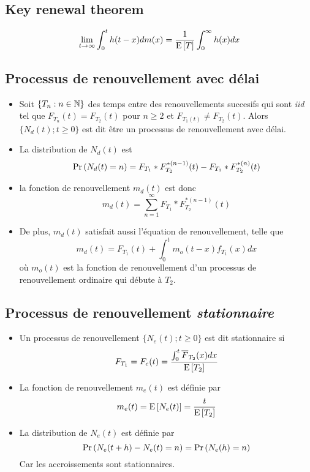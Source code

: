 \documentclass[10pt, french]{article}
\begin{document}
\begin{multicols*}{2}
\subsection*{Key renewal theorem}
\[\lim_{t \to \infty} \int_{0}^{t} h(t-x) d m(x) = \frac{1}{\mathrm{E} \left[ T \right]} \int_{0}^{\infty} h(x) dx \]

\subsection*{Processus de renouvellement avec délai}
\begin{itemize}
\item Soit $\{ T_n : n \in \mathbb{N} \}$ des temps entre des renouvellements succesifs qui sont \emph{iid} tel que $F_{T_n}(t) = F_{T_2}(t)$ pour $n \geq 2$ et $F_{T_1(t)} \neq F_{T_2}(t)$. Alors $\{N_d(t) ; t \geq 0 \}$ est dit être un processus de renouvellement avec délai. 

\item La distribution de $N_d(t)$ est
\[\Pr \left( N_d(t) = n \right) = F_{T_1} \ast F_{T_2}^{\ast(n-1)}(t) - F_{T_1} \ast F_{T_2}^{\ast (n)}(t)  \]

\item la fonction de renouvellement $m_d(t)$ est donc
\[m_d(t) = \sum_{n=1}^{\infty} F_{T_1} \ast F_{T_2}^{\ast (n-1)}(t)  \]

\item De plus, $m_d(t)$ satisfait aussi l'équation de renouvellement, telle que
\[m_d(t) = F_{T_1}(t) + \int_{0}^{t}  m_o(t-x) f_{T_1}(x) dx \]
où $m_o(t)$ est la fonction de renouvellement d'un processus de renouvellement ordinaire qui débute à $T_2$.
\end{itemize}

\subsection*{Processus de renouvellement \emph{stationnaire}}
\begin{itemize}
\item Un processus de renouvellement $\{ N_e(t) ; t \geq 0 \}$ est dit stationnaire si
\[F_{T_1} = F_e(t) = \frac{\int_{0}^{t} \overline{F}_{T_2}(x) dx  }{\mathrm{E} \left[ T_2 \right]}\]

\item La fonction de renouvellement $m_e(t)$ est définie par
\[m_e(t) = \mathrm{E} \left[ N_e(t) \right] = \frac{t}{\mathrm{E} \left[ T_2 \right]} \]

\item La distribution de $N_e(t)$ est définie par
\[\Pr \left( N_e(t+h) - N_e(t) = n \right) = \Pr \left( N_e(h) = n \right)\]
Car les accroissements sont stationnaires.
\end{itemize}


\end{multicols*}
\end{document}
